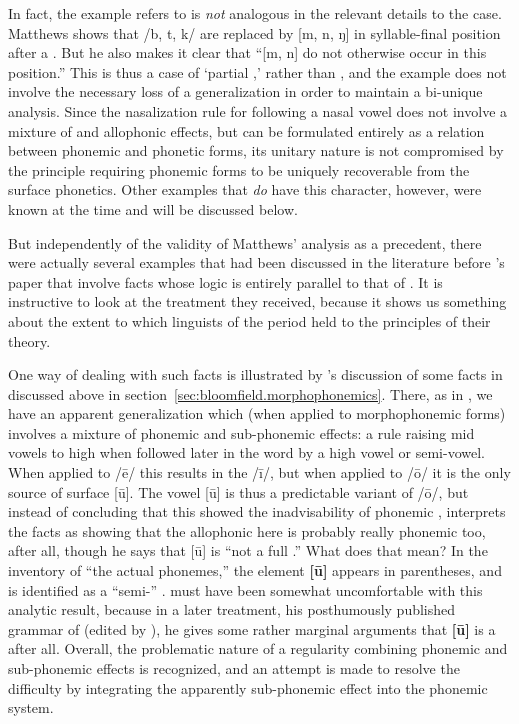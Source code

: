 In fact, the example {\Halle} refers to is \emph{not} analogous in the
relevant details to the  case. Matthews shows that /b, t, k/
are replaced by {[m, n, ŋ]} in syllable-final position after a
. But he also makes it clear \citep[57, fn.
3]{matthews:dakota_phonemics} that ``{[m, n]} do not otherwise occur
in this position.'' This is thus a case of `partial ,'
rather than , and the example does not involve the
necessary loss of a generalization in order to maintain a bi-unique
analysis. Since the nasalization rule for  following a nasal
vowel does not involve a mixture of  and allophonic
effects, but can be formulated entirely as a relation between phonemic
and phonetic forms, its unitary nature is not compromised by the
principle requiring phonemic forms to be uniquely recoverable from the
surface phonetics. Other examples that \emph{do} have this character,
however, were known at the time and will be discussed below.
 
But independently of the validity of Matthews' analysis as a
precedent, there were actually several examples that had been
discussed in the literature before {\Halle}'s paper that involve facts
whose logic is entirely parallel to that of  
. It is instructive to look at the treatment they
received, because it shows us something about the extent to which
linguists of the period held to the principles of their theory.

One way of dealing with such facts is illustrated by {\Bloomfield}'s
discussion of some facts in  discussed above in
section~\ref{sec:bloomfield.morphophonemics}.  There, as in , we have an
apparent generalization which (when applied to morphophonemic forms)
involves a mixture of phonemic and sub-phonemic effects: a rule
raising mid vowels to high when followed later in the word by a high
vowel or semi-vowel. When applied to /ē/ this results in the 
/ī/, but when applied to /ō/ it is the only source of surface
{[ū]}. The vowel {[ū]} is thus a predictable variant of /ō/, but
instead of concluding that this showed the inadvisability of phonemic
, {\Bloomfield} interprets the facts as showing that the
allophonic  here is probably really phonemic too, after all,
though he says that {[ū]} is ``not a full .'' What does that
mean? In the inventory of ``the actual  phonemes,'' the
element \textbf{[ū]} appears in parentheses, and is identified as a
``semi-'' \citep[\S5]{bloomfield:menomini_morphophonemics}.
{\Bloomfield} must have been somewhat uncomfortable with this analytic
result, because in a later treatment, his posthumously published
grammar of  (edited by {\Hockett}), he gives some rather marginal
arguments that \textbf{[ū]} is a  after all. Overall, the
problematic nature of a regularity combining phonemic and sub-phonemic
effects is recognized, and an attempt is made to resolve the
difficulty by integrating the apparently sub-phonemic effect into the
phonemic system.
  
